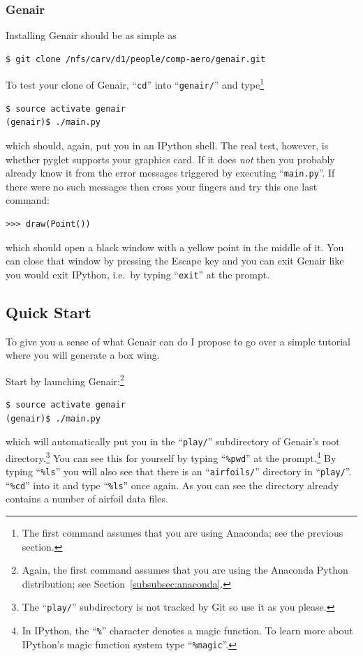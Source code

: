 \documentclass[]{article}
\begin{document}
\subsubsection{Genair}

Installing Genair should be as simple as
\begin{verbatim}
$ git clone /nfs/carv/d1/people/comp-aero/genair.git
\end{verbatim}
To test your clone of Genair, ``\texttt{cd}'' into ``\texttt{genair/}'' 
and type\footnote{The first command assumes that you are using Anaconda; 
see the previous section.}
\begin{verbatim}
$ source activate genair
(genair)$ ./main.py
\end{verbatim}
which should, again, put you in an IPython shell.  The real test, 
however, is whether pyglet supports your graphics card.  If it does 
\emph{not} then you probably already know it from the error messages 
triggered by executing ``\texttt{main.py}''.  If there were no such 
messages then cross your fingers and try this one last command:
\begin{verbatim}
>>> draw(Point())
\end{verbatim}
which should open a black window with a yellow point in the middle of 
it.  You can close that window by pressing the Escape key and you can 
exit Genair like you would exit IPython, i.e.\ by typing 
``\texttt{exit}'' at the prompt.

\subsection{Quick Start}
\label{subsec:quick}

To give you a sense of what Genair can do I propose to go over a simple 
tutorial where you will generate a box wing.

Start by launching Genair:\footnote{Again, the first command assumes 
that you are using the Anaconda Python distribution; see 
Section~\ref{subsubsec:anaconda}.}
\begin{verbatim}
$ source activate genair
(genair)$ ./main.py
\end{verbatim}
which will automatically put you in the ``\texttt{play/}'' subdirectory 
of Genair's root directory.\footnote{The ``\texttt{play/}'' subdirectory 
is not tracked by Git so use it as you please.}  You can see this for 
yourself by typing ``\texttt{\%pwd}'' at the prompt.\footnote{In 
IPython, the ``\texttt{\%}'' character denotes a magic function.  To 
learn more about IPython's magic function system type 
``\texttt{\%magic}''.}  By typing ``\texttt{\%ls}'' you will also see 
that there is an ``\texttt{airfoils/}'' directory in ``\texttt{play/}''.  
``\texttt{\%cd}'' into it and type ``\texttt{\%ls}'' once again.  As you 
can see the directory already contains a number of airfoil data files.
\end{document}
